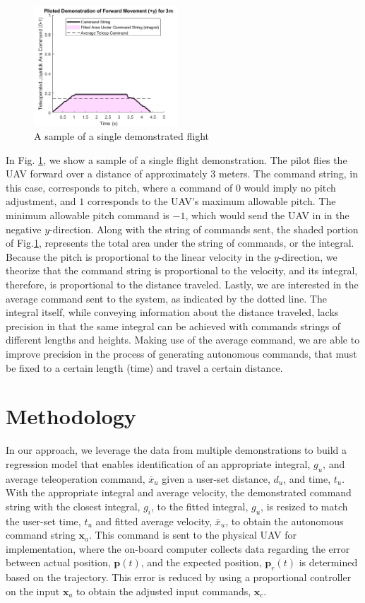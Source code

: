 \documentclass[letterpaper, 10 pt, conference]{ieeeconf}  %
\begin{document}
\begin{figure}[h]
    \includegraphics[width=0.48\textwidth]{images/sampleintegral.png}
    \caption{A sample of a single demonstrated flight}
    \label{fig:sampleintegral}
\end{figure}
In Fig. \ref{fig:sampleintegral}, we show a sample of a single flight demonstration. The pilot flies the UAV forward over a distance of approximately $3$ meters. The command string, in this case, corresponds to pitch, where a command of $0$ would imply no pitch adjustment, and $1$ corresponds to the UAV's maximum allowable pitch. The minimum allowable pitch command is $-1$, which would send the UAV in in the negative $y$-direction. Along with the string of commands sent, the shaded portion of Fig.\ref{fig:sampleintegral}, represents the total area under the string of commands, or the integral. Because the pitch is proportional to the linear velocity in the $y$-direction, we theorize that the command string is proportional to the velocity, and its integral, therefore, is proportional to the distance traveled. Lastly, we are interested in the average command sent to the system, as indicated by the dotted line. The integral itself, while conveying information about the distance traveled, lacks precision in that the same integral can be achieved with commands strings of different lengths and heights. Making use of the average command, we are able to improve precision in the process of generating autonomous commands, that must be fixed to a certain length (time) and travel a certain distance.

\section{Methodology}
In our approach, we leverage the data from multiple demonstrations to build a regression model that enables identification of an appropriate integral, $g_u$, and average teleoperation command, $\bar{x}_u$ given a user-set distance, $d_u$, and time, $t_u$. With the appropriate integral and average velocity, the demonstrated command string with the closest integral, $g_i$, to the fitted integral, $g_u$, is resized to match the user-set time, $t_u$ and fitted average velocity, $\bar{x}_u$, to obtain the autonomous command string $\mathbf{x}_a$. This command is sent to the physical UAV for implementation, where the on-board computer collects data regarding the error between actual position, $\mathbf{p}(t)$, and the expected position, $\mathbf{p}_r(t)$ is determined based on the trajectory. This error is reduced by using a proportional controller on the input $\mathbf{x}_a$ to obtain the adjusted input commands, $\mathbf{x}_c$.
\end{document}
